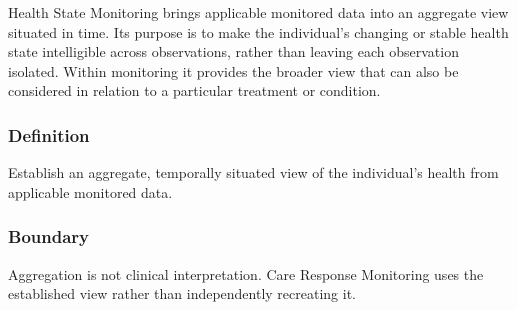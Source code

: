 Health State Monitoring brings applicable monitored data into an aggregate view situated in time. Its purpose is to make the individual's changing or stable health state intelligible across observations, rather than leaving each observation isolated. Within monitoring it provides the broader view that can also be considered in relation to a particular treatment or condition.

\subsubsection*{Definition}

Establish an aggregate, temporally situated view of the individual’s health from applicable monitored data.

\subsubsection*{Boundary}

Aggregation is not clinical interpretation. Care Response Monitoring uses the established view rather than independently recreating it.

